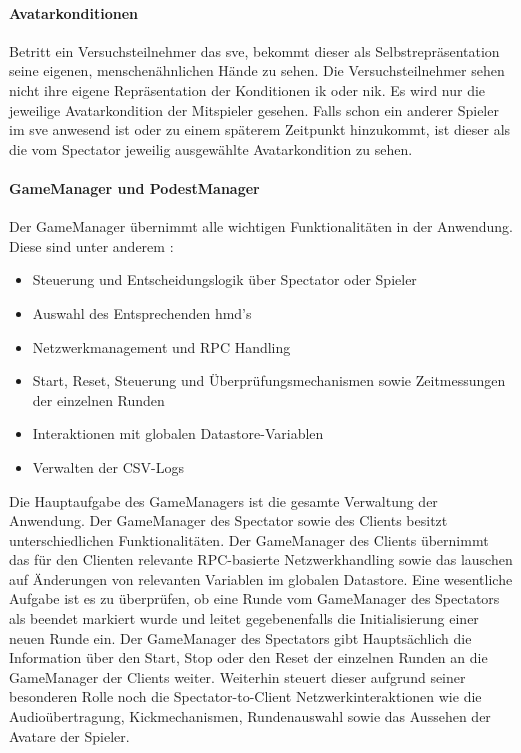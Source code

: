 \documentclass[a4paper,11pt]{article}%
\renewcommand{\\}{\vspace*{0.5\baselineskip} \newline}
\begin{document}
\paragraph{Avatarkonditionen}
Betritt ein Versuchsteilnehmer das \ac{sve}, bekommt dieser als Selbstrepräsentation seine eigenen, menschenähnlichen Hände zu sehen. Die Versuchsteilnehmer sehen nicht ihre eigene Repräsentation der Konditionen \ac{ik} oder \ac{nik}. Es wird nur die jeweilige Avatarkondition der Mitspieler gesehen.
Falls schon ein anderer Spieler im \ac{sve} anwesend ist oder zu einem späterem Zeitpunkt hinzukommt, ist dieser als die vom Spectator jeweilig ausgewählte Avatarkondition zu sehen. 

\paragraph{GameManager und PodestManager}
Der GameManager übernimmt alle wichtigen Funktionalitäten in der Anwendung.
Diese sind unter anderem :
\begin{itemize}
\item Steuerung und Entscheidungslogik über Spectator oder Spieler
\item Auswahl des Entsprechenden \ac{hmd}'s
\item Netzwerkmanagement und RPC Handling
\item Start, Reset, Steuerung und Überprüfungsmechanismen sowie Zeitmessungen der einzelnen Runden
\item Interaktionen mit globalen Datastore-Variablen
\item Verwalten der CSV-Logs
\end{itemize}

Die Hauptaufgabe des GameManagers ist die gesamte Verwaltung der Anwendung. Der GameManager des Spectator sowie des Clients besitzt unterschiedlichen Funktionalitäten. 
Der GameManager des Clients übernimmt das für den Clienten relevante RPC-basierte Netzwerkhandling sowie das lauschen auf Änderungen von relevanten Variablen im globalen Datastore.
Eine wesentliche Aufgabe ist es zu überprüfen, ob eine Runde vom GameManager des Spectators als beendet markiert wurde und leitet gegebenenfalls die Initialisierung einer neuen Runde ein.
Der GameManager des Spectators gibt Hauptsächlich die Information über den Start, Stop oder den Reset der einzelnen Runden an die GameManager der Clients weiter. Weiterhin steuert dieser aufgrund seiner besonderen Rolle noch die Spectator-to-Client Netzwerkinteraktionen wie die Audioübertragung, Kickmechanismen, Rundenauswahl sowie das Aussehen der Avatare der Spieler.
\end{document}
